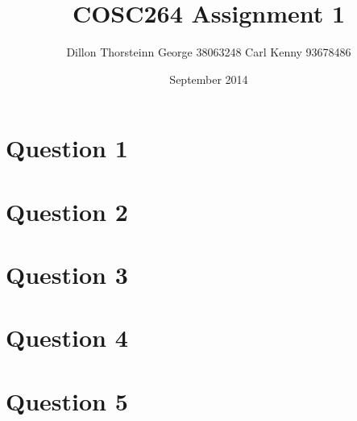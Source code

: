 \documentclass{article}
\title{COSC264 Assignment 1}
\author{Dillon Thorsteinn George 38063248 Carl Kenny 93678486}
\date{September 2014}
\begin{document}
\null  %
\nointerlineskip  %
\vfill
\let\snewpage \newpage
\let\newpage \relax
\maketitle
\let \newpage \snewpage
\vfill 
\break %

\newpage

\section{Question 1}

\section{Question 2}

\section{Question 3}

\section{Question 4}

\section{Question 5}
\end{document}
